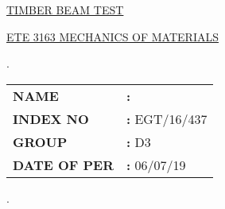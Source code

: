 \documentclass[12pt,a4paper]{article}
\begin{document}
\begin{titlepage}
	
	\begin{flushright}
    \end{flushright}

    \vspace*{\fill}
    \begin{center}
        \uppercase{\fontsize{10mm}{16mm}\selectfont \ul{TIMBER BEAM TEST}}\\
    \end{center}
    \begin{center}
        \uppercase{\fontsize{8mm}{16mm}\selectfont \ul{ETE 3163 Mechanics of Materials}}\\
    \end{center}
    \vfill %

  \begin{minipage}{0.45\linewidth}
      .
  \end{minipage}
  \begin{minipage}{0.55\linewidth}

        \fontsize{4.8mm}{5mm} \selectfont
        \begin{tabular}{ll}
            \vspace{4mm}
            \textbf{\uppercase{{Name}}}       &
            \textbf{\uppercase{:}} 
            \uppercase{\selectfont {B Gnanakeethan}}      \\
            \vspace{4mm}
            \textbf{\uppercase{{Index No}}}   &
            \textbf{\uppercase{:}} 
            \uppercase{EGT/16/437}  \\
            \vspace{4mm}
            \textbf{\uppercase{{Group}}} &
            \textbf{\uppercase{:}} 
            \uppercase{D3}\\
            \vspace{4mm}
            \textbf{\uppercase{{Date of Per}}}   &
            \textbf{\uppercase{:}} 
            \uppercase{06/07/19}  \\
        \end{tabular}
  \end{minipage}

\end{titlepage}


\tableofcontents
\listoffigures
\listoftables
\newpage
{}
\setcounter{page}{1}



\newpage
.
\newpage

\begin{thebibliography}{7}
\end{thebibliography}
\end{document}
